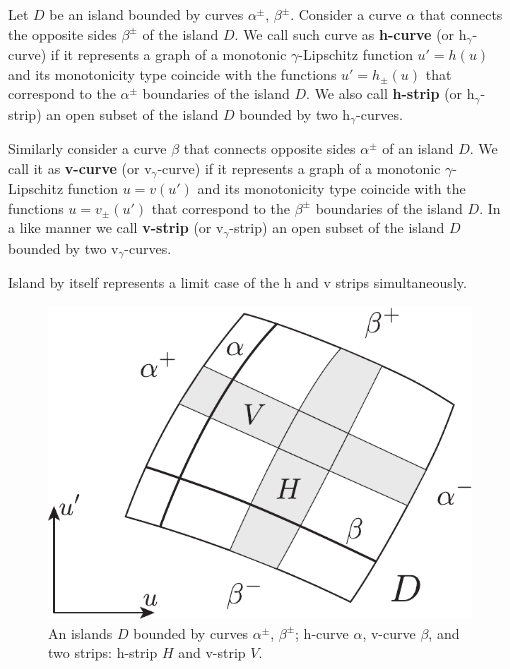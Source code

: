 \begin{definition}
	Let $D$ be an island bounded by curves $\alpha^{\pm}$, $\beta^{\pm}$.
	Consider a curve $\alpha$ that connects the opposite sides $\beta^{\pm}$ of the island $D$. 
	We call such curve as {\bf h-curve} (or $\mathrm{h}_{\gamma}$-curve) if it represents a graph of a monotonic $\gamma$-Lipschitz function $u' = h(u)$ and its monotonicity type coincide with the functions $u' = h_{\pm}(u)$ that correspond to the $\alpha^{\pm}$ boundaries of the island $D$.
	We also call {\bf h-strip} (or $\mathrm{h}_{\gamma}$-strip) an open subset of the island $D$ bounded by two $\mathrm{h}_{\gamma}$-curves.
\end{definition}

\begin{definition}
	Similarly consider a curve $\beta$ that connects opposite sides $\alpha^{\pm}$ of an island $D$.
	We call it as {\bf v-curve} (or $\mathrm{v}_{\gamma}$-curve) if it represents a graph of a monotonic $\gamma$-Lipschitz function $u = v(u')$ and its monotonicity type coincide with the functions $u = v_{\pm}(u')$ that correspond to the $\beta^{\pm}$ boundaries of the island $D$.
	In a like manner we call {\bf v-strip} (or $\mathrm{v}_{\gamma}$-strip) an open subset of the island $D$ bounded by two $\mathrm{v}_{\gamma}$-curves.
\end{definition}

\begin{remark}
	Island by itself represents a limit case of the h and v strips simultaneously.
\end{remark}

\begin{figure}[h]
\centering
	\includegraphics[scale = 1]{pic/curves and strips}
	\caption{An islands $D$ bounded by curves $\alpha^{\pm}$, $\beta^{\pm}$; h-curve $\alpha$, v-curve $\beta$, and two strips: h-strip $H$ and v-strip $V$.}
\label{fig:curves-and-strips}
\end{figure}

